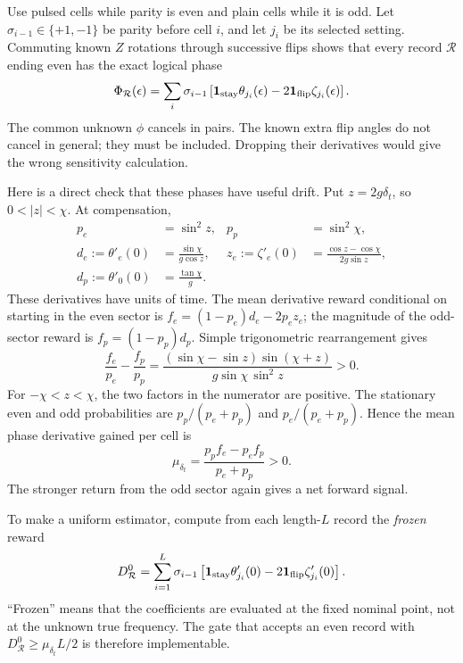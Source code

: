 \documentclass[11pt,a4paper]{article}
\numberwithin{equation}{section}
\theoremstyle{remark}
\begin{document}
Use pulsed cells while parity is even and plain cells while it is odd.
Let $\sigma_{i-1}\in\{+1,-1\}$ be parity before cell $i$, and let $j_i$ be
its selected setting. Commuting known $Z$ rotations through successive flips
shows that every record $\mathcal R$ ending even has the exact logical phase
\begin{equation}
 \Phi_{\mathcal R}(\epsilon)
 =\sum_i\sigma_{i-1}
 \left[\mathbf1_{\rm stay}\theta_{j_i}(\epsilon)
       -2\mathbf1_{\rm flip}\zeta_{j_i}(\epsilon)\right].
 \label{tim:known-phase}
\end{equation}
The common unknown $\phi$ cancels in pairs. The known extra flip angles do
not cancel in general; they must be included. Dropping their derivatives
would give the wrong sensitivity calculation.

Here is a direct check that these phases have useful drift. Put $z=2g\delta_t$,
so $0<|z|<\chi$. At compensation,
\begin{align}
 p_e&=\sin^2z,& p_p&=\sin^2\chi,\nonumber\\
 d_e:=\theta'_e(0)&=\frac{\sin\chi}{g\cos z},&
 z_e:=\zeta'_e(0)&=\frac{\cos z-\cos\chi}{2g\sin z},\nonumber\\
 d_p:=\theta'_0(0)&=\frac{\tan\chi}{g}.&&
\end{align}
These derivatives have units of time. The mean derivative reward conditional
on starting in the even sector is
$f_e=(1-p_e)d_e-2p_ez_e$; the magnitude of the odd-sector reward is
$f_p=(1-p_p)d_p$. Simple trigonometric rearrangement gives
\begin{equation}
 \frac{f_e}{p_e}-\frac{f_p}{p_p}
 =\frac{(\sin\chi-\sin z)\sin(\chi+z)}
 {g\sin\chi\,\sin^2z}>0.
 \label{tim:contrast}
\end{equation}
For $-\chi<z<\chi$, the two factors in the numerator are positive.
The stationary even and odd probabilities are
$p_p/(p_e+p_p)$ and $p_e/(p_e+p_p)$. Hence the mean phase derivative gained
per cell is
\begin{equation}
 \mu_{\delta_t}=\frac{p_pf_e-p_ef_p}{p_e+p_p}>0.
\end{equation}
The stronger return from the odd sector again gives a net forward signal.

To make a uniform estimator, compute from each length-$L$ record the
\emph{frozen} reward
\begin{equation}
 D_{\mathcal R}^0=\sum_{i=1}^L\sigma_{i-1}
 \left[\mathbf1_{\rm stay}\theta'_{j_i}(0)
       -2\mathbf1_{\rm flip}\zeta'_{j_i}(0)\right].
 \label{tim:frozen-reward}
\end{equation}
``Frozen'' means that the coefficients are evaluated at the fixed nominal
point, not at the unknown true frequency. The gate that accepts an even
record with $D_{\mathcal R}^0\ge\mu_{\delta_t} L/2$ is therefore implementable.
\end{document}
